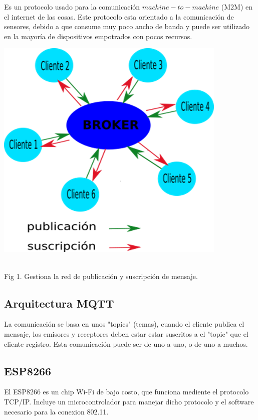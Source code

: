 \documentclass[letterpaper, 10 pt, conference]{ieeeconf}
\begin{document}
Es un protocolo usado para la comunicación $machine-to-machine$ (M2M) en el internet de las cosas. Este protocolo esta orientado a la comunicación de sensores, debido a que consume muy poco ancho de banda y puede ser utilizado en la mayoría de dispositivos empotrados con pocos recursos.

\begin{center}
\includegraphics[scale=0.5]{Figura1.png}
\begin{scriptsize}\\ 
Fig 1. Gestiona la red de publicación y suscripción de mensaje.
\end{scriptsize}
\end{center}

\subsection{Arquitectura MQTT}

La comunicación se basa en unos "topics" (temas), cuando el cliente publica el mensaje, los emisores y receptores deben estar estar suscritos a el "topic" que el cliente registro. Esta comunicación puede ser de uno a uno, o de uno a muchos. 

\subsection{ESP8266}

El ESP8266 es un chip Wi-Fi de bajo costo, que funciona mediente el protocolo TCP/IP. Incluye un microcontrolador para manejar dicho protocolo y el software necesario para la conexion 802.11.
\end{document}
